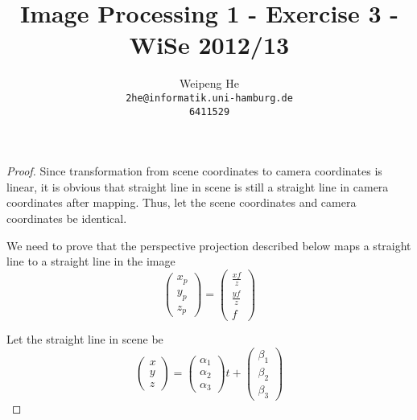 \documentclass[a4paper,11pt]{article}
\title{Image Processing 1 - Exercise 3 - WiSe 2012/13}
\author{Weipeng He \\ \texttt{2he@informatik.uni-hamburg.de} \\ \texttt{6411529}}
\begin{document}
\maketitle

\section{}

\begin{proof}

Since transformation from scene coordinates to camera coordinates is linear, it is obvious that straight line in scene is still a straight line in camera coordinates after mapping. 
Thus, let the scene coordinates and camera coordinates be identical. 

We need to prove that the perspective projection described below maps a straight line to a straight line in the image
\[ \begin{pmatrix} x_p \\ y_p \\ z_p \end{pmatrix} = \begin{pmatrix} \frac{xf}{z} \\ \frac{yf}{z}  \\ f \end{pmatrix}  \]

Let the straight line in scene be
\[ \begin{pmatrix} x \\ y \\ z \end{pmatrix} = \begin{pmatrix} \alpha_1 \\ \alpha_2 \\ \alpha_3 \end{pmatrix} t + \begin{pmatrix} \beta_1 \\ \beta_2 \\ \beta_3 \end{pmatrix} \]


\end{proof}
\end{document}
